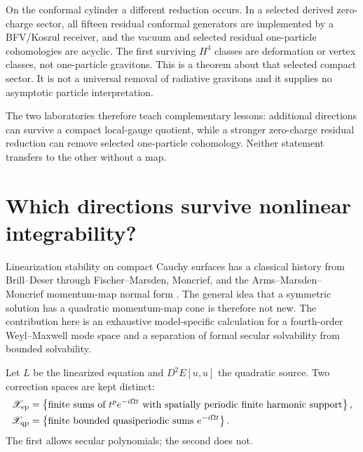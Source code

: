 \documentclass[11pt]{article}
\begin{document}
On the conformal cylinder a different reduction occurs.  In a selected
derived zero-charge sector, all fifteen residual conformal generators are
implemented by a BFV/Koszul receiver, and the vacuum and selected residual
one-particle cohomologies are acyclic.  The first surviving $H^4$ classes are
deformation or vertex classes, not one-particle gravitons.  This is a theorem
about that selected compact sector.  It is not a universal removal of
radiative gravitons and it supplies no asymptotic particle interpretation.

The two laboratories therefore teach complementary lessons: additional
directions can survive a compact local-gauge quotient, while a stronger
zero-charge residual reduction can remove selected one-particle
cohomology.  Neither statement transfers to the other without a map.

\section{Which directions survive nonlinear integrability?}

Linearization stability on compact Cauchy surfaces has a classical history
from Brill--Deser through Fischer--Marsden, Moncrief, and the
Arms--Marsden--Moncrief momentum-map normal form
\cite{BrillDeser,FischerMarsden,Moncrief,AMM}.  The general idea that a
symmetric solution has a quadratic momentum-map cone is therefore not new.
The contribution here is an exhaustive model-specific calculation for a
fourth-order Weyl--Maxwell mode space and a separation of formal secular
solvability from bounded solvability.

Let $L$ be the linearized equation and $D^2E[u,u]$ the quadratic source.  Two
correction spaces are kept distinct:
\begin{align}
 \mathscr X_{\rm ep}
 &=\left\{\text{finite sums of }t^p e^{-i\Omega t}
    \text{ with spatially periodic finite harmonic support}\right\},\\
 \mathscr X_{\rm qp}
 &=\left\{\text{finite bounded quasiperiodic sums }
    e^{-i\Omega t}\right\}.
\end{align}
The first allows secular polynomials; the second does not.
\end{document}

